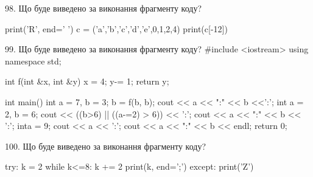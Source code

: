 \documentclass[11pt]{article}
\begin{document}
98. Що буде виведено за виконання фрагменту коду?

print('R', end=' ')
c = ('a','b','c','d','e',0,1,2,4)
print(c[-12])



99. Що буде виведено за виконання фрагменту коду?
#include <iostream>
using namespace std;

int f(int &x, int &y){
    x = 4;
    y-= 1;
    return y;
}

int main(){
    int a = 7, b = 3;
    b = f(b, b);
    cout << a << ":" << b <<':';
    {
        int a = 2, b = 6;
        cout << ((b>6) || ((a-=2) > 6)) << ':';
        cout << a << ":" << b << ':';
    }
    {
        inta = 9;
        cout << a << ':';
    }
    cout << a << ":" << b << endl;
    return 0;
}



100. Що буде виведено за виконання фрагменту коду?

try:
    k = 2
    while k<=8:
        k += 2
    print(k, end=';')
except:
    print('Z')



\newpage
\end{document}
